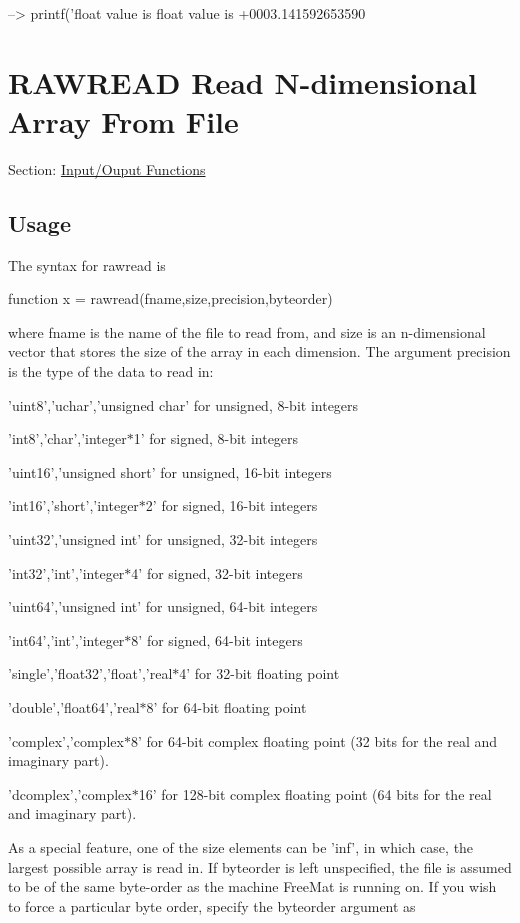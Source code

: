 \begin{DoxyVerbInclude}
--> printf('float value is %
float value is +0003.141592653590
\end{DoxyVerbInclude}
 \hypertarget{io_rawread}{}\section{R\-A\-W\-R\-E\-A\-D Read N-\/dimensional Array From File}\label{io_rawread}
Section\-: \hyperlink{sec_io}{Input/\-Ouput Functions} \hypertarget{vtkwidgets_vtkxyplotwidget_Usage}{}\subsection{Usage}\label{vtkwidgets_vtkxyplotwidget_Usage}
The syntax for {\ttfamily rawread} is \begin{DoxyVerb}   function x = rawread(fname,size,precision,byteorder)
\end{DoxyVerb}
 where {\ttfamily fname} is the name of the file to read from, and {\ttfamily size} is an n-\/dimensional vector that stores the size of the array in each dimension. The argument {\ttfamily precision} is the type of the data to read in\-: 
\begin{DoxyItemize}
\item 'uint8','uchar','unsigned char' for unsigned, 8-\/bit integers  
\item 'int8','char','integer$\ast$1' for signed, 8-\/bit integers  
\item 'uint16','unsigned short' for unsigned, 16-\/bit integers  
\item 'int16','short','integer$\ast$2' for signed, 16-\/bit integers  
\item 'uint32','unsigned int' for unsigned, 32-\/bit integers  
\item 'int32','int','integer$\ast$4' for signed, 32-\/bit integers  
\item 'uint64','unsigned int' for unsigned, 64-\/bit integers  
\item 'int64','int','integer$\ast$8' for signed, 64-\/bit integers  
\item 'single','float32','float','real$\ast$4' for 32-\/bit floating point  
\item 'double','float64','real$\ast$8' for 64-\/bit floating point  
\item 'complex','complex$\ast$8' for 64-\/bit complex floating point (32 bits for the real and imaginary part).  
\item 'dcomplex','complex$\ast$16' for 128-\/bit complex floating point (64 bits for the real and imaginary part).  
\end{DoxyItemize}As a special feature, one of the size elements can be 'inf', in which case, the largest possible array is read in. If {\ttfamily byteorder} is left unspecified, the file is assumed to be of the same byte-\/order as the machine {\ttfamily Free\-Mat} is running on. If you wish to force a particular byte order, specify the {\ttfamily byteorder} argument as 
